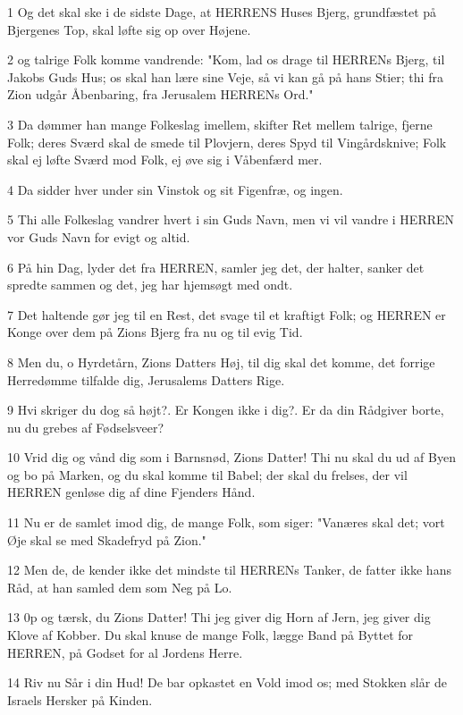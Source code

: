 \par 1 Og det skal ske i de sidste Dage, at HERRENS Huses Bjerg, grundfæstet på Bjergenes Top, skal løfte sig op over Højene.
\par 2 og talrige Folk komme vandrende: "Kom, lad os drage til HERRENs Bjerg, til Jakobs Guds Hus; os skal han lære sine Veje, så vi kan gå på hans Stier; thi fra Zion udgår Åbenbaring, fra Jerusalem HERRENs Ord."
\par 3 Da dømmer han mange Folkeslag imellem, skifter Ret mellem talrige, fjerne Folk; deres Sværd skal de smede til Plovjern, deres Spyd til Vingårdsknive; Folk skal ej løfte Sværd mod Folk, ej øve sig i Våbenfærd mer.
\par 4 Da sidder hver under sin Vinstok og sit Figenfræ, og ingen.
\par 5 Thi alle Folkeslag vandrer hvert i sin Guds Navn, men vi vil vandre i HERREN vor Guds Navn for evigt og altid.
\par 6 På hin Dag, lyder det fra HERREN, samler jeg det, der halter, sanker det spredte sammen og det, jeg har hjemsøgt med ondt.
\par 7 Det haltende gør jeg til en Rest, det svage til et kraftigt Folk; og HERREN er Konge over dem på Zions Bjerg fra nu og til evig Tid.
\par 8 Men du, o Hyrdetårn, Zions Datters Høj, til dig skal det komme, det forrige Herredømme tilfalde dig, Jerusalems Datters Rige.
\par 9 Hvi skriger du dog så højt?. Er Kongen ikke i dig?. Er da din Rådgiver borte, nu du grebes af Fødselsveer?
\par 10 Vrid dig og vånd dig som i Barnsnød, Zions Datter! Thi nu skal du ud af Byen og bo på Marken, og du skal komme til Babel; der skal du frelses, der vil HERREN genløse dig af dine Fjenders Hånd.
\par 11 Nu er de samlet imod dig, de mange Folk, som siger: "Vanæres skal det; vort Øje skal se med Skadefryd på Zion."
\par 12 Men de, de kender ikke det mindste til HERRENs Tanker, de fatter ikke hans Råd, at han samled dem som Neg på Lo.
\par 13 0p og tærsk, du Zions Datter! Thi jeg giver dig Horn af Jern, jeg giver dig Klove af Kobber. Du skal knuse de mange Folk, lægge Band på Byttet for HERREN, på Godset for al Jordens Herre.
\par 14 Riv nu Sår i din Hud! De bar opkastet en Vold imod os; med Stokken slår de Israels Hersker på Kinden.

